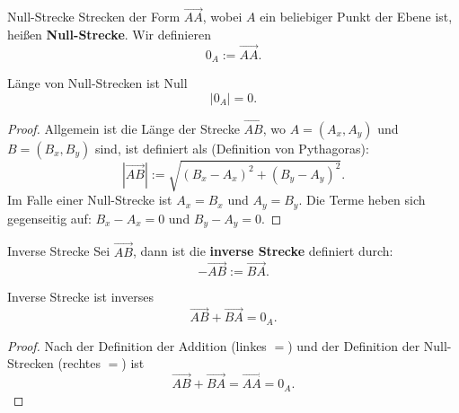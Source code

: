 \documentclass[a4paper]{amsart}
\theoremstyle{definition}
\begin{document}
\begin{Definition}{Null-Strecke}
   Strecken der Form $\overrightarrow{AA}$, wobei $A$ ein beliebiger Punkt der Ebene ist, heißen \textbf{Null-Strecke}. Wir definieren
   \begin{equation}
      0_A := \overrightarrow{AA}.
   \end{equation}   
\end{Definition}

\begin{Satz}{Länge von Null-Strecken ist Null}
   \begin{equation}
      |0_A| = 0.
   \end{equation}
\end{Satz}
\begin{proof}
   Allgemein ist die Länge der Strecke $\overrightarrow{AB}$, wo $A = (A_x, A_y)$ und $B= (B_x,B_y)$ sind, ist definiert als (Definition von Pythagoras):
   \begin{equation}
      |\overrightarrow{AB}| := \sqrt{ (B_x-A_x)^2 + (B_y-A_y)^2}.
   \end{equation}
   Im Falle einer Null-Strecke ist $A_x = B_x$ und $A_y = B_y$. Die Terme heben sich gegenseitig auf: $B_x-A_x = 0$ und $B_y-A_y = 0$.
\end{proof}

\begin{Definition}{Inverse Strecke}
   Sei $\overrightarrow{AB}$, dann ist die \textbf{inverse Strecke} definiert durch:
   \begin{equation}
      - \overrightarrow{AB} := \overrightarrow{BA}.
   \end{equation}   
\end{Definition}

\begin{Satz}{Inverse Strecke ist inverses}
   \begin{equation}
      \overrightarrow{AB} + \overrightarrow{BA} = 0_A.
   \end{equation}
\end{Satz}
\begin{proof}
   Nach der Definition der Addition (linkes $=$) und der Definition der Null-Strecken (rechtes $=$) ist
   \begin{equation}
      \overrightarrow{AB} + \overrightarrow{BA} = \overrightarrow{AA} = 0_A.
   \end{equation}
\end{proof}
\end{document}
